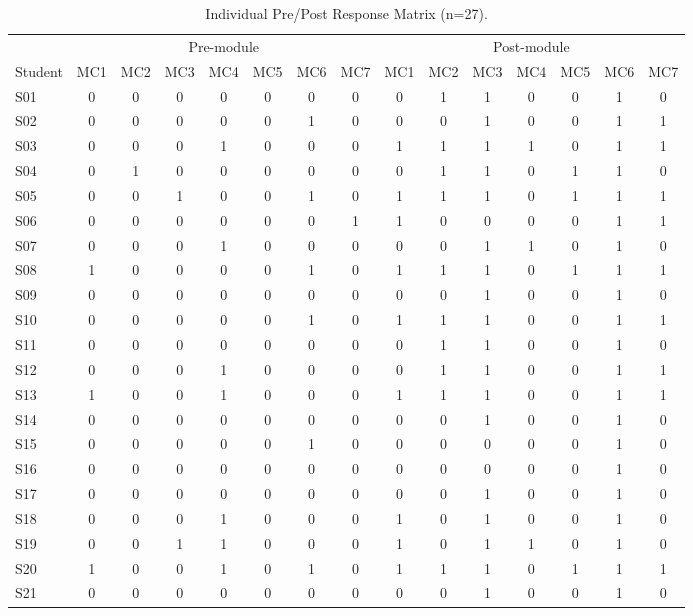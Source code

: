 \documentclass[11pt]{article}
\begin{document}
\begin{table}[h]
\centering
\caption{Individual Pre/Post Response Matrix (n=27).}
\label{tab:transitions}
\begin{tabular}{l|ccccccc|ccccccc}
\toprule
\multicolumn{1}{c|}{} & \multicolumn{7}{c|}{Pre-module} & \multicolumn{7}{c}{Post-module} \\
\cline{2-15}
Student & MC1 & MC2 & MC3 & MC4 & MC5 & MC6 & MC7 & MC1 & MC2 & MC3 & MC4 & MC5 & MC6 & MC7 \\
\midrule
S01 & 0 & 0 & 0 & 0 & 0 & 0 & 0 & 0 & 1 & 1 & 0 & 0 & 1 & 0 \\
S02 & 0 & 0 & 0 & 0 & 0 & 1 & 0 & 0 & 0 & 1 & 0 & 0 & 1 & 1 \\
S03 & 0 & 0 & 0 & 1 & 0 & 0 & 0 & 1 & 1 & 1 & 1 & 0 & 1 & 1 \\
S04 & 0 & 1 & 0 & 0 & 0 & 0 & 0 & 0 & 1 & 1 & 0 & 1 & 1 & 0 \\
S05 & 0 & 0 & 1 & 0 & 0 & 1 & 0 & 1 & 1 & 1 & 0 & 1 & 1 & 1 \\
S06 & 0 & 0 & 0 & 0 & 0 & 0 & 1 & 1 & 0 & 0 & 0 & 0 & 1 & 1 \\
S07 & 0 & 0 & 0 & 1 & 0 & 0 & 0 & 0 & 0 & 1 & 1 & 0 & 1 & 0 \\
S08 & 1 & 0 & 0 & 0 & 0 & 1 & 0 & 1 & 1 & 1 & 0 & 1 & 1 & 1 \\
S09 & 0 & 0 & 0 & 0 & 0 & 0 & 0 & 0 & 0 & 1 & 0 & 0 & 1 & 0 \\
S10 & 0 & 0 & 0 & 0 & 0 & 1 & 0 & 1 & 1 & 1 & 0 & 0 & 1 & 1 \\
S11 & 0 & 0 & 0 & 0 & 0 & 0 & 0 & 0 & 1 & 1 & 0 & 0 & 1 & 0 \\
S12 & 0 & 0 & 0 & 1 & 0 & 0 & 0 & 0 & 1 & 1 & 0 & 0 & 1 & 1 \\
S13 & 1 & 0 & 0 & 1 & 0 & 0 & 0 & 1 & 1 & 1 & 0 & 0 & 1 & 1 \\
S14 & 0 & 0 & 0 & 0 & 0 & 0 & 0 & 0 & 0 & 1 & 0 & 0 & 1 & 0 \\
S15 & 0 & 0 & 0 & 0 & 0 & 1 & 0 & 0 & 0 & 0 & 0 & 0 & 1 & 0 \\
S16 & 0 & 0 & 0 & 0 & 0 & 0 & 0 & 0 & 0 & 0 & 0 & 0 & 1 & 0 \\
S17 & 0 & 0 & 0 & 0 & 0 & 0 & 0 & 0 & 0 & 1 & 0 & 0 & 1 & 0 \\
S18 & 0 & 0 & 0 & 1 & 0 & 0 & 0 & 1 & 0 & 1 & 0 & 0 & 1 & 0 \\
S19 & 0 & 0 & 1 & 1 & 0 & 0 & 0 & 1 & 0 & 1 & 1 & 0 & 1 & 0 \\
S20 & 1 & 0 & 0 & 1 & 0 & 1 & 0 & 1 & 1 & 1 & 0 & 1 & 1 & 1 \\
S21 & 0 & 0 & 0 & 0 & 0 & 0 & 0 & 0 & 0 & 1 & 0 & 0 & 1 & 0 \\

\end{tabular}
\end{table}
\end{document}
